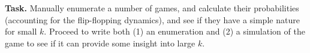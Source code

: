 \documentclass[10pt]{article}        	%
\begin{document}
\bigskip
\noindent \textbf{Task.} Manually enumerate a number of games, and calculate their probabilities (accounting for the flip-flopping dynamics), and see if they have a simple nature for small $k$. Proceed to write both (1) an enumeration and (2) a simulation of the game to see if it can provide some insight into large $k$.

\end{document}
